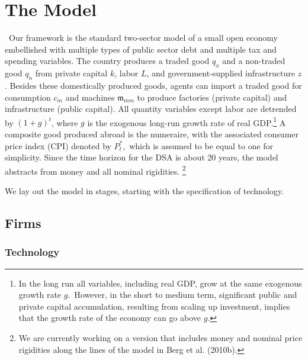 \documentclass[11pt]{article}
\begin{document}
\section{The Model}

\quad\ \thinspace Our framework is the standard two-sector model of a small
open economy embellished with multiple types of public sector debt and
multiple tax and spending variables. The country produces a traded good $%
q_{x}$ and a non-traded good $q_{n}$ from private capital $k$, labor $L$,
and government-supplied infrastructure $z$. Besides these domestically
produced goods, agents can import a traded good for consumption $c_{m}$ and
machines $\mathfrak{m}_{mm}$ to produce factories (private capital) and
infrastructure (public capital). All quantity variables except labor are
detrended by $(1+g)^{t}$, where $g$ is the exogenous long-run growth rate of
real GDP.\footnote{%
In the long run all variables, including real GDP, grow at the same
exogenous growth rate $g.$\ However, in the short to medium term,
significant public and private capital accumulation, resulting from scaling
up investment, implies that the growth rate of the economy can go above $g.$}
A composite good produced abroad is the numeraire, with the associated
consumer price index (CPI) denoted by $P_{t}^{\ast },$ which is assumed to
be equal to one for simplicity. Since the time horizon for the DSA is about
20 years, the model abstracts from money and all nominal rigidities.%
\footnote{%
We are currently working on a version that includes money and nominal price
rigidities along the lines of the model in Berg et al. (2010b).}

We lay out the model in stages, starting with the specification of
technology.

\subsection{Firms}

\subsubsection{Technology}
\end{document}
